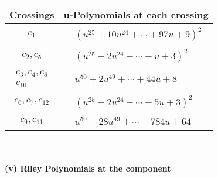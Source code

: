 \documentclass[1p]{elsarticle_modified}
\theoremstyle{definition}
\begin{document}
\begin{tabular}{m{50pt}|m{274pt}}
Crossings & \hspace{64pt}u-Polynomials at each crossing \\
\hline $$\begin{aligned}c_{1}\end{aligned}$$&$\begin{aligned}
&(u^{25}+10 u^{24}+\cdots+97 u+9)^{2}
\end{aligned}$\\
\hline $$\begin{aligned}c_{2},c_{5}\end{aligned}$$&$\begin{aligned}
&(u^{25}-2 u^{24}+\cdots- u+3)^{2}
\end{aligned}$\\
\hline $$\begin{aligned}c_{3},c_{4},c_{8}\\c_{10}\end{aligned}$$&$\begin{aligned}
&u^{50}+2 u^{49}+\cdots+44 u+8
\end{aligned}$\\
\hline $$\begin{aligned}c_{6},c_{7},c_{12}\end{aligned}$$&$\begin{aligned}
&(u^{25}+2 u^{24}+\cdots-5 u+3)^{2}
\end{aligned}$\\
\hline $$\begin{aligned}c_{9},c_{11}\end{aligned}$$&$\begin{aligned}
&u^{50}-28 u^{49}+\cdots-784 u+64
\end{aligned}$\\
\hline
\end{tabular}\\~\\
\newpage\renewcommand{\arraystretch}{1}
\flushleft \textbf{(v) Riley Polynomials at the component}\newline \\
\end{document}

